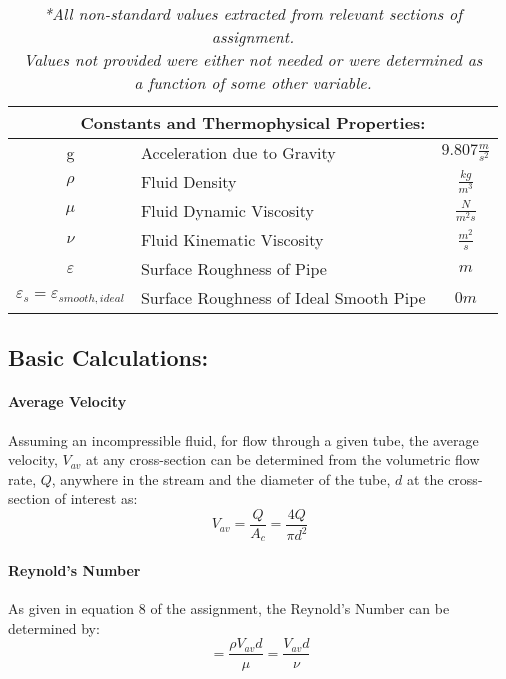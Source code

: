 \documentclass[12pt]{article}
\begin{document}
	\hfill\break\break
	\begin{table}
		\centering
		{
		\begin{tabular}{|c|l|c|}
		\hline
			\multicolumn{3}{|c|}{\textbf{Constants and Thermophysical Properties:}} \\
		\hline
		\hline
			g & Acceleration due to Gravity & $9.807\frac{m}{s^2}$\\
			$\rho$ & Fluid Density & $\frac{kg}{m^3}$\\
			$\mu$ & Fluid Dynamic Viscosity & $\frac{N}{m^2s}$\\
			$\nu$ & Fluid Kinematic Viscosity & $\frac{m^2}{s}$\\
			$\varepsilon$ & Surface Roughness of Pipe & $m$ \\
			$\varepsilon_s=\varepsilon_{smooth,ideal}$ & Surface Roughness of Ideal Smooth Pipe & $0 m$ \\
		\hline
		\end{tabular}
		}
		\caption*{\textit{*All non-standard values extracted from relevant sections of assignment. \\ Values not provided were either not needed or were determined as \\ a function of some other variable.}}
	\end{table}


	\subsection{Basic Calculations:}
	\paragraph{Average Velocity}
		Assuming an incompressible fluid, for flow through a given tube, the average velocity, $V_{av}$ at any cross-section can be determined from the volumetric flow rate, $Q$, anywhere in the stream and the diameter of the tube, $d$ at the cross-section of interest as:
		\begin{equation}
			V_{av} = \frac{Q}{A_{c}} = \frac{4Q}{\pi d^2}
		\end{equation}
		
	\paragraph{Reynold's Number}
	As given in equation 8 of the assignment, the Reynold's Number can be determined by:
	\begin{equation}
		[Re] = \frac{\rho V_{av}d}{\mu} = \frac{V_{av}d}{\nu}
	\end{equation}
	
\end{document}

